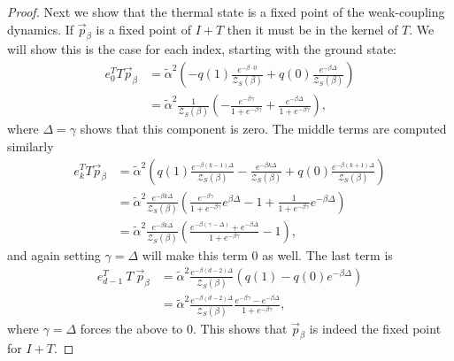 \documentclass{article}
\newcommand{\partfun}{\mathcal{Z}}
\begin{document}
\begin{proof}
Next we show that the thermal state is a fixed point of the weak-coupling dynamics. If $\vec{p}_{\beta}$ is a fixed point of $I + T$ then it must be in the kernel of $T$. We will show this is the case for each index, starting with the ground state:
\begin{align}
    e_0^T T \vec{p}_{\beta} &= \widetilde{\alpha}^2 \left( -q(1) \frac{e^{-\beta \cdot 0}}{\partfun_S(\beta)} + q(0) \frac{e^{-\beta \Delta}}{\partfun_S(\beta)} \right) \\
    &= \widetilde{\alpha}^2 \frac{1}{\partfun_S(\beta)} \left( - \frac{e^{-\beta \gamma}}{1 + e^{-\beta \gamma}} + \frac{e^{-\beta \Delta}}{1 + e^{-\beta \gamma}} \right),
\end{align}
where $\Delta = \gamma$ shows that this component is zero. 
The middle terms are computed similarly
\begin{align}
    e_k^T T \vec{p}_{\beta} &= \widetilde{\alpha}^2 \left( q(1) \frac{e^{-\beta (k - 1)\Delta }}{\partfun_S(\beta)} - \frac{e^{-\beta k \Delta}}{\partfun_S(\beta)} + q(0) \frac{e^{-\beta (k + 1) \Delta}}{\partfun_S(\beta)} \right) \\
    &= \widetilde{\alpha}^2 \frac{e^{-\beta k \Delta}}{\partfun_S(\beta)} \left( \frac{e^{-\beta \gamma}}{1 + e^{-\beta \gamma}} e^{\beta \Delta} - 1 + \frac{1}{1 + e^{-\beta \gamma}} e^{-\beta \Delta} \right) \\
    &= \widetilde{\alpha}^2 \frac{e^{-\beta k \Delta}}{\partfun_S(\beta)} \left( \frac{e^{-\beta (\gamma - \Delta)} + e^{-\beta \Delta}}{1 + e^{-\beta \gamma}} - 1 \right),  
\end{align}
and again setting $\gamma = \Delta$ will make this term 0 as well. The last term is
\begin{align}
    e_{d - 1}^T ~T ~\vec{p}_{\beta} &= \widetilde{\alpha}^2 \frac{e^{-\beta (d - 2) \Delta}}{\partfun_S(\beta)} \left( q(1) - q(0) e^{-\beta \Delta} \right) \\
    &= \widetilde{\alpha}^2 \frac{e^{-\beta (d - 2) \Delta}}{\partfun_S(\beta)} \frac{e^{-\beta \gamma} - e^{-\beta \Delta}}{1 + e^{-\beta \gamma}}, 
\end{align}
where $\gamma = \Delta$ forces the above to 0. This shows that $\vec{p}_{\beta}$ is indeed the fixed point for $I + T$. 


\end{proof}
\end{document}
